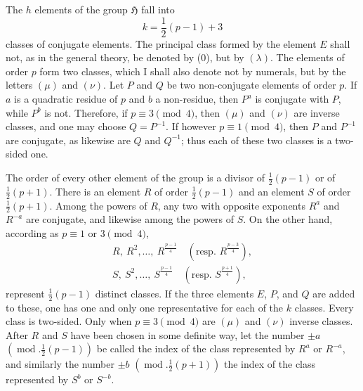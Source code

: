 \documentclass[11pt]{article}
\newcommand{\grp}{\mathfrak{H}}
\begin{document}
The $h$ elements of the group $\grp$ fall into
\begin{equation*}\tag{4.}
k=\frac{1}{2}(p-1)+3
\end{equation*}
classes of conjugate elements. The principal class formed by the element $E$ shall not, as in the general theory, be denoted by (0), but by $(\lambda)$. The elements of order $p$ form two classes, which I shall also denote not by numerals, but by the letters $(\mu)$ and $(\nu)$. Let $P$ and $Q$ be two non-conjugate elements of order $p$. If $a$ is a quadratic residue of $p$ and $b$ a non-residue, then $P^a$ is conjugate with $P$, while $P^b$ is not. Therefore, if $p\equiv3\pmod{4}$, then $(\mu)$ and $(\nu)$ are inverse classes, and one may choose $Q=P^{-1}$. If however $p\equiv1\pmod{4}$, then $P$ and $P^{-1}$ are conjugate, as likewise are $Q$ and $Q^{-1}$; thus each of these two classes is a two-sided one.

The order of every other element of the group is a divisor of $\frac12(p-1)$ or of $\frac12(p+1)$. There is an element $R$ of order $\frac12(p-1)$ and an element $S$ of order $\frac12(p+1)$. Among the powers of $R$, any two with opposite exponents $R^a$ and $R^{-a}$ are conjugate, and likewise among the powers of $S$. On the other hand, according as $p\equiv1$ or $3\pmod{4}$,
\begin{equation*}\tag{5.}
\begin{array}{c}
R,\ R^2,\ldots,\ R^{\frac{p-1}{4}}\quad\left(\text{resp. }R^{\frac{p-3}{4}}\right),\\[0.35em]
S,\ S^2,\ldots,\ S^{\frac{p-1}{4}}\quad\left(\text{resp. }S^{\frac{p+1}{4}}\right),
\end{array}
\end{equation*}
represent $\frac12(p-1)$ distinct classes. If the three elements $E$, $P$, and $Q$ are added to these, one has one and only one representative for each of the $k$ classes. Every class is two-sided. Only when $p\equiv3\pmod{4}$ are $(\mu)$ and $(\nu)$ inverse classes. After $R$ and $S$ have been chosen in some definite way, let the number $\pm a$ $\left(\operatorname{mod}.\frac12(p-1)\right)$ be called the index of the class represented by $R^a$ or $R^{-a}$, and similarly the number $\pm b$ $\left(\operatorname{mod}.\frac12(p+1)\right)$ the index of the class represented by $S^b$ or $S^{-b}$.
\end{document}
